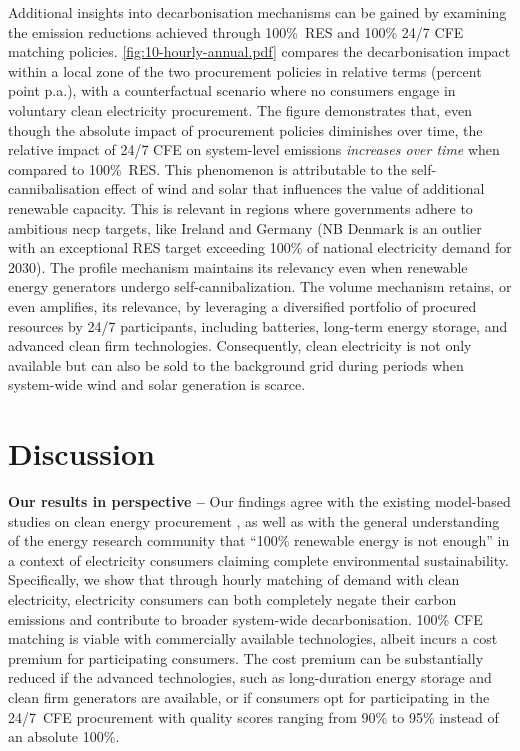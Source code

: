 \documentclass[11pt, 5p, nopreprintline]{elsarticle}
\begin{document}
Additional insights into decarbonisation mechanisms can be gained by examining the emission reductions achieved through 100\%~RES and 100\% 24/7 CFE matching policies.
\cref{fig:10-hourly-annual.pdf} compares the decarbonisation impact within a local zone of the two procurement policies in relative terms (percent point p.a.), with a counterfactual scenario where no consumers engage in voluntary clean electricity procurement.
The figure demonstrates that, even though the absolute impact of procurement policies diminishes over time, the relative impact of 24/7 CFE on system-level emissions \textit{increases over time} when compared to 100\%~RES.
This phenomenon is attributable to the self-cannibalisation effect of wind and solar that influences the value of additional renewable capacity.
This is relevant in regions where governments adhere to ambitious \gls{necp} targets, like Ireland and Germany (NB Denmark is an outlier with an exceptional RES target exceeding 100\% of national electricity demand for 2030).
The profile mechanism maintains its relevancy even when renewable energy generators undergo self-cannibalization.
The volume mechanism retains, or even amplifies, its relevance, by leveraging a diversified portfolio of procured resources by 24/7 participants, including batteries, long-term energy storage, and advanced clean firm technologies.
Consequently, clean electricity is not only available but can also be sold to the background grid during periods when system-wide wind and solar generation is scarce.


\section{Discussion}
\label{sec:discussion}


\textbf{Our results in perspective --} Our findings agree with the existing model-based studies on clean energy procurement \cite{xu-247CFE-SSRN,ieaAdvancingDecarbonisationClean2022,peninsula-report247}, as well as with the general understanding of the energy research community that \enquote{100\% renewable energy is not enough} \cite{chalendar-2019} in a context of electricity consumers claiming complete environmental sustainability.
Specifically, we show that through hourly matching of demand with clean electricity, electricity consumers can both completely negate their carbon emissions and contribute to broader system-wide decarbonisation.
100\% CFE matching is viable with commercially available technologies, albeit incurs a cost premium for participating consumers.
The cost premium can be substantially reduced if the advanced technologies, such as long-duration energy storage and clean firm generators are available, or if consumers opt for participating in the 24/7~CFE procurement with quality scores ranging from 90\% to 95\% instead of an absolute 100\%.
\end{document}
